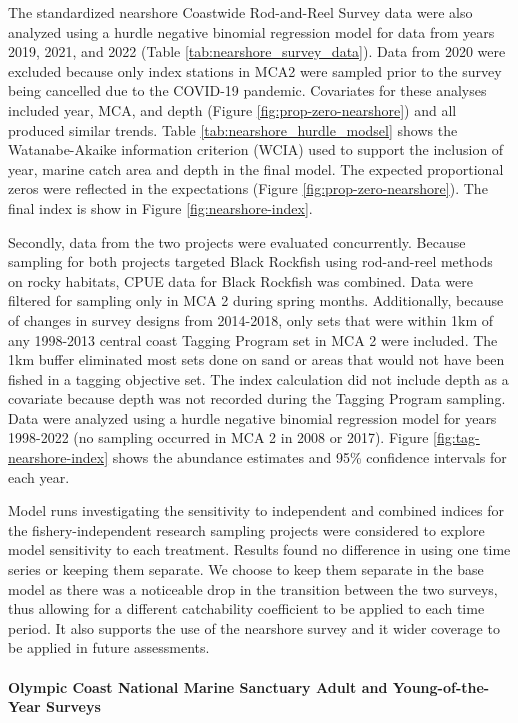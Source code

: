 \documentclass[11pt,
  letterpaper,
]{article}
\begin{document}
The standardized nearshore Coastwide Rod-and-Reel Survey data were also analyzed using a hurdle negative binomial regression model for data from years 2019, 2021, and 2022 (Table \ref{tab:nearshore_survey_data}). Data from 2020 were excluded because only index stations in MCA2 were sampled prior to the survey being cancelled due to the COVID-19 pandemic. Covariates for these analyses included year, MCA, and depth (Figure \ref{fig:prop-zero-nearshore}) and all produced similar trends. Table \ref{tab:nearshore_hurdle_modsel} shows the Watanabe-Akaike information criterion (WCIA) used to support the inclusion of year, marine catch area and depth in the final model. The expected proportional zeros were reflected in the expectations (Figure \ref{fig:prop-zero-nearshore}). The final index is show in Figure \ref{fig:nearshore-index}.

Secondly, data from the two projects were evaluated concurrently. Because sampling for both projects targeted Black Rockfish using rod-and-reel methods on rocky habitats, CPUE data for Black Rockfish was combined. Data were filtered for sampling only in MCA 2 during spring months. Additionally, because of changes in survey designs from 2014-2018, only sets that were within 1km of any 1998-2013 central coast Tagging Program set in MCA 2 were included. The 1km buffer eliminated most sets done on sand or areas that would not have been fished in a tagging objective set. The index calculation did not include depth as a covariate because depth was not recorded during the Tagging Program sampling. Data were analyzed using a hurdle negative binomial regression model for years 1998-2022 (no sampling occurred in MCA 2 in 2008 or 2017). Figure \ref{fig:tag-nearshore-index} shows the abundance estimates and 95\% confidence intervals for each year.

Model runs investigating the sensitivity to independent and combined indices for the fishery-independent research sampling projects were considered to explore model sensitivity to each treatment. Results found no difference in using one time series or keeping them separate. We choose to keep them separate in the base model as there was a noticeable drop in the transition between the two surveys, thus allowing for a different catchability coefficient to be applied to each time period. It also supports the use of the nearshore survey and it wider coverage to be applied in future assessments.

\hypertarget{olympic-coast-national-marine-sanctuary-adult-and-young-of-the-year-surveys}{%
\paragraph{Olympic Coast National Marine Sanctuary Adult and Young-of-the-Year Surveys}\label{olympic-coast-national-marine-sanctuary-adult-and-young-of-the-year-surveys}}
\end{document}
